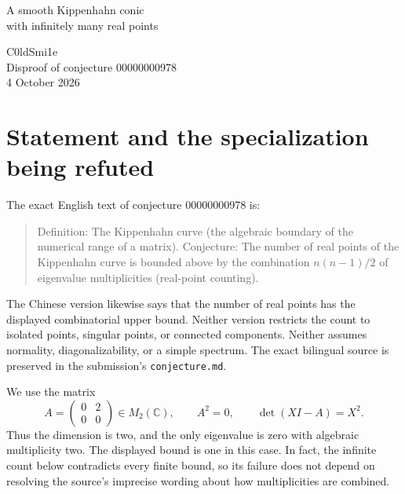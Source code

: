 \documentclass[10pt,letterpaper]{article}
\newcommand{\C}{\mathbb{C}}
\begin{document}
\begin{center}
{\LARGE A smooth Kippenhahn conic\\[3pt]with infinitely many real points\par}
\vspace{10pt}
C0ldSmi1e\\[2pt]
{\small Disproof of conjecture 00000000978\\4 October 2026}
\end{center}
\vspace{3pt}
\begin{abstract}
The matrix $A=\left(\begin{smallmatrix}0&2\\0&0\end{smallmatrix}\right)$ has numerical range equal to the closed unit disk. Its smooth homogeneous Hermitian determinant pencil is $w^2-u^2-v^2$, and the real affine chart of its complex projective dual is the unit circle. The real algebraic boundary of the numerical range is the same circle. A rational parametrization proves that it has infinitely many real points, contradicting the proposed bound $n(n-1)/2=1$ in dimension two. Every matrix identity and the relevant numerical-range, algebraic-closure, and counting bridges are established for this witness.
\end{abstract}

\section{Statement and the specialization being refuted}
The exact English text of conjecture 00000000978 is:
\begin{quote}
Definition: The Kippenhahn curve (the algebraic boundary of the numerical range of a matrix). Conjecture: The number of real points of the Kippenhahn curve is bounded above by the combination $n(n-1)/2$ of eigenvalue multiplicities (real-point counting).
\end{quote}
The Chinese version likewise says that the number of real points has the displayed combinatorial upper bound. Neither version restricts the count to isolated points, singular points, or connected components. Neither assumes normality, diagonalizability, or a simple spectrum. The exact bilingual source is preserved in the submission's \texttt{conjecture.md}.

We use the matrix
\begin{equation}\label{eq:A}
A=\begin{pmatrix}0&2\\0&0\end{pmatrix}\in M_2(\C),
\qquad A^2=0,\qquad \det(XI-A)=X^2.
\end{equation}
Thus the dimension is two, and the only eigenvalue is zero with algebraic multiplicity two. The displayed bound is one in this case. In fact, the infinite count below contradicts every finite bound, so its failure does not depend on resolving the source's imprecise wording about how multiplicities are combined.
\end{document}
